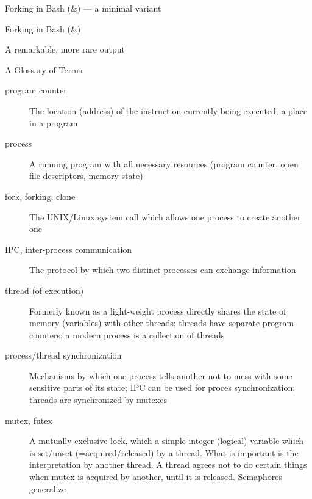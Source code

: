 \documentclass[pdflatex,colorlinks,landscape]{beamer}
\renewcommand\emph[1]{{\color{magenta}#1}}
\begin{document}
\begin{frame}{Forking in Bash (\&) --- a minimal variant}
  
\end{frame}
  
\begin{frame}[allowframebreaks]{Forking in Bash (\&)}
  \begin{small}
    
  \end{small}
\end{frame}

\begin{frame}{A remarkable, more rare output}
\end{frame}


\begin{frame}[allowframebreaks]{A Glossary of Terms}
  \begin{description}
  \item[program counter] The location (address) of the instruction currently
    being executed; a place in a program
  \item[process] A running program with all necessary resources
    (program counter, open file descriptors, memory state)
  \item[fork, forking, clone] The UNIX/Linux \emph{system call}
    which allows one process to create another one
  \item[IPC, inter-process communication] The protocol by which
    two distinct processes can exchange information
  \item[thread (of execution)] Formerly known as \emph{a light-weight process}
    directly shares the state of memory (variables) with other
    threads; threads have \emph{separate program counters};
    a modern process is a \emph{collection of threads}
  \item[process/thread synchronization] Mechanisms by which
    one process tells another not to mess with some sensitive
    parts of its state; IPC can be used for proces synchronization;
    threads are synchronized by \emph{mutexes}
  \item[mutex, futex] A mutually exclusive lock, which a simple integer
    (logical) variable which is set/unset (=acquired/released) by a
    thread. What is important is the \emph{interpretation} by another
    thread.  A thread agrees not to do certain things when mutex is
    acquired by another, until it is released. \emph{Semaphores} generalize

\end{description}
\end{frame}
\end{document}
